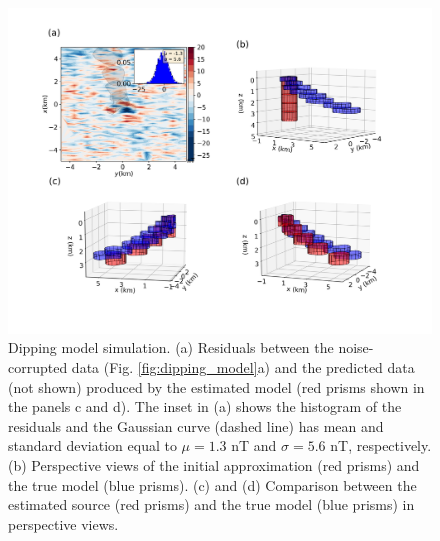 \begin{figure}
    \centering
    \includegraphics[width=\linewidth]{figures/inclined-l2-solution.png}
    \caption{Dipping model simulation. (a) Residuals between the  noise-corrupted data (Fig. \ref{fig:dipping_model}a) and the predicted data (not shown) produced by the estimated model (red prisms shown in the panels c and d). The inset in (a) shows the histogram of the residuals and the Gaussian curve (dashed line) has mean and standard deviation equal 
    to $\mu = 1.3$ nT and $\sigma=5.6$ nT, respectively. (b) Perspective views of the initial approximation (red prisms) and the true model (blue prisms). (c) and (d) Comparison between the estimated source (red prisms) and the true model (blue prisms) in perspective views.     
}
    \label{fig:dipping_results}
\end{figure}



